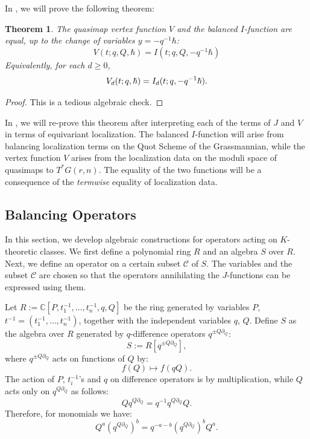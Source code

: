 \documentclass{amsart}
\newtheorem{thm}{Theorem}[section]
\begin{document}
In , we will prove the following theorem:


    \begin{thm}\label{thm:V=balI} The quasimap vertex function $V$ and the balanced $I$-function are equal, up to the change of variables
   $y = -q^{-1} \hbar$:
   \[ V(t;q,Q,\hbar)= I(t; q, Q,-q^{-1} \hbar)\]
   Equivalently, for each $d \ge 0$, 
   \[ V_d(t;q,\hbar)= I_d(t; q, -q^{-1} \hbar) \/.\]
\end{thm}
\begin{proof} This is a tedious algebraic check.\end{proof}
In , we will re-prove this theorem after interpreting each of the terms
of $J$ and $V$ in terms of equivariant localization. The balanced $I$-function will arise from balancing 
localization terms on the Quot Scheme of the Grassmannian, while the vertex function $V$ arises from 
the localization data on the moduli space of quasimaps to $T^*G(r,n)$. The equality of the two functions
will be a consequence of the {\em termwise} equality of localization data.

\subsection{Balancing Operators}\label{operator for operators}
In this section, we develop algebraic constructions for operators acting on $K$-theoretic classes. We first define a polynomial ring $R$ and an algebra $S$ over $R$. Next, we define an operator on a certain subset $\mathcal{C}$ of $S$. The variables and the subset $\mathcal{C}$ are chosen so that the operators annihilating the $J$-functions can be expressed using them. 

        Let $R := \mathbb{C}[P,t_1^{-1},\dots,t_n^{-1},q,Q]$ be the ring generated by variables $P$, $t^{-1}=(t_1^{-1},\dots,t_n^{-1})$, together with the independent variables $q$, $Q$. Define $S$ as the algebra over $R$ generated by $q$-difference operators $q^{\pm Q \partial_{Q}}$:
        \[
        S:=R[q^{\pm Q \partial_{Q}}],
       \]
       where $q^{\pm Q \partial_{Q}}$ acts on functions of $Q$ by:
        \begin{equation} \label{diff op}
        f(Q) \mapsto f(qQ).
        \end{equation}
        The action of $P$, $t_i^{-1}$'s and $q$ on difference operators is by multiplication, while $Q$ acts only on $q^{Q \partial_{Q}}$ as follows:
        \[
        Qq^{Q \partial_{Q}} = q^{-1}q^{Q \partial_{Q}}Q.
        \]
        Therefore, for monomials we have:
        \[
Q^{a} (q^{Q \partial_{Q}})^{b}
=  q^{-a-b} (q^{Q \partial_{Q}})^{b} Q^{a}.
\]
\end{document}
